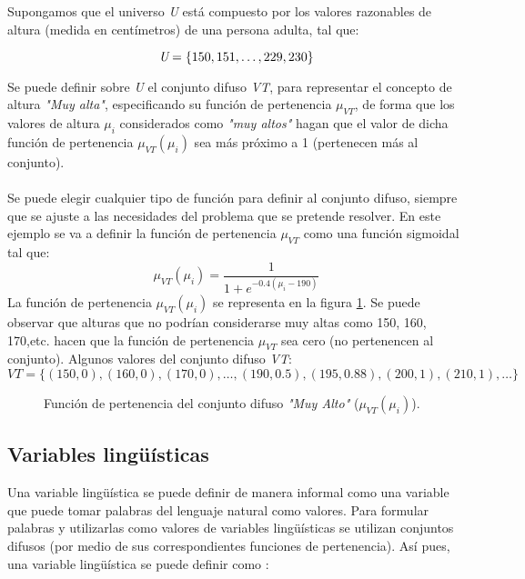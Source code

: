\begin{example}
\normalfont
Supongamos que el universo \emph{U} está compuesto por los valores razonables de altura (medida en centímetros) de una persona adulta, tal que:

\begin{equation}
\emph{U} = \{150,151,\ldots,229,230\}
\end{equation}

Se puede definir sobre \emph{U} el conjunto difuso \emph{VT}, para representar el concepto de altura \emph{"Muy alta"}, especificando su función de pertenencia \emph{$\mu_{VT}$}, de forma que los valores de altura \emph{$\mu_{i}$} considerados como \emph{"muy altos"} hagan que el valor de dicha función de pertenencia \emph{$\mu_{VT}(\mu_{i})$} sea más próximo a 1 (pertenecen más al conjunto).\\
\\
Se puede elegir cualquier tipo de función para definir al conjunto difuso, siempre que se ajuste a las necesidades del problema que se pretende resolver. En este ejemplo se va a definir la función de pertenencia \emph{$\mu_{VT}$} como una función sigmoidal tal que:
\begin{equation}
\mu_{VT}(\mu_{i}) = \frac{1}{1 + e^{-0.4(\mu_{i}-190)}}
\end{equation}
La función de pertenencia $\mu_{VT}(\mu_{i})$ se representa en la figura \ref{fig:fuzzyset-verytall-example}. Se puede observar que alturas que no podrían considerarse muy altas como 150, 160, 170,etc. hacen que la función de pertenencia  $\mu_{VT}$ sea cero (no pertenencen al conjunto). Algunos valores del conjunto difuso \emph{VT}:
\begin{equation}
VT = \{(150,0),(160,0),(170,0),\ldots,(190,0.5),(195,0.88),(200,1),(210,1),\ldots\}
\end{equation}
\end{example}

\begin{figure}[t]
	\centering
	\newlength\figureheight 
	\newlength\figurewidth
	\setlength\figureheight{4.5cm}
	\setlength\figurewidth{12cm}
	
	\caption{Función de pertenencia del conjunto difuso \emph{"Muy Alto"} ($\mu_{VT}(\mu_{i})$).}
	\label{fig:fuzzyset-verytall-example}
\end{figure}

\subsection{Variables lingüísticas}
\label{sec:lang-variables}
Una variable lingüística se puede definir de manera informal como una variable que puede tomar palabras del lenguaje natural como valores. Para formular palabras y utilizarlas como valores de variables lingüísticas se utilizan conjuntos difusos (por medio de sus correspondientes funciones de pertenencia). Así pues, una variable lingüística se puede definir como \cite{wang1997}:

